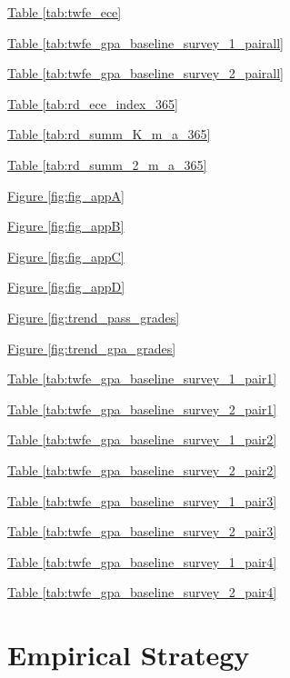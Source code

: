 \hyperref[tab:twfe_ece]{Table \ref{tab:twfe_ece}}

\hyperref[tab:twfe_gpa_baseline_survey_1_pairall]{Table \ref{tab:twfe_gpa_baseline_survey_1_pairall}}

\hyperref[tab:twfe_gpa_baseline_survey_2_pairall]{Table \ref{tab:twfe_gpa_baseline_survey_2_pairall}}

\hyperref[tab:rd_ece_index_365]{Table \ref{tab:rd_ece_index_365}}

\hyperref[tab:rd_summ_K_m_a_365]{Table \ref{tab:rd_summ_K_m_a_365}}

\hyperref[tab:rd_summ_2_m_a_365]{Table \ref{tab:rd_summ_2_m_a_365}}

\hyperref[fig:fig_appA]{Figure \ref{fig:fig_appA}}

\hyperref[fig:fig_appB]{Figure \ref{fig:fig_appB}}

\hyperref[fig:fig_appC]{Figure \ref{fig:fig_appC}}

\hyperref[fig:fig_appD]{Figure \ref{fig:fig_appD}}

\hyperref[fig:trend_pass_grades]{Figure \ref{fig:trend_pass_grades}}

\hyperref[fig:trend_gpa_grades]{Figure \ref{fig:trend_gpa_grades}}




\hyperref[tab:twfe_gpa_baseline_survey_1_pair1]{Table \ref{tab:twfe_gpa_baseline_survey_1_pair1}}

\hyperref[tab:twfe_gpa_baseline_survey_2_pair1]{Table \ref{tab:twfe_gpa_baseline_survey_2_pair1}}


\hyperref[tab:twfe_gpa_baseline_survey_1_pair2]{Table \ref{tab:twfe_gpa_baseline_survey_1_pair2}}

\hyperref[tab:twfe_gpa_baseline_survey_2_pair2]{Table \ref{tab:twfe_gpa_baseline_survey_2_pair2}}


\hyperref[tab:twfe_gpa_baseline_survey_1_pair3]{Table \ref{tab:twfe_gpa_baseline_survey_1_pair3}}

\hyperref[tab:twfe_gpa_baseline_survey_2_pair3]{Table \ref{tab:twfe_gpa_baseline_survey_2_pair3}}


\hyperref[tab:twfe_gpa_baseline_survey_1_pair4]{Table \ref{tab:twfe_gpa_baseline_survey_1_pair4}}

\hyperref[tab:twfe_gpa_baseline_survey_2_pair4]{Table \ref{tab:twfe_gpa_baseline_survey_2_pair4}}




\section{Empirical Strategy}\label{sec:empirical_strategy}

